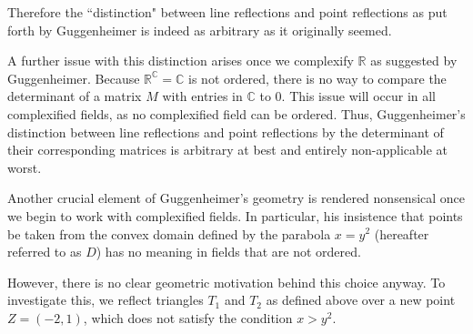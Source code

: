 \documentclass[12pt]{article}
\newcommand{\R}{\mathbb{R}}
\newcommand{\C}{\mathbb{C}}
\theoremstyle{plain}
\theoremstyle{definition}
\begin{document}
Therefore the ``distinction" between line reflections and point reflections as put forth by Guggenheimer is indeed as arbitrary as it originally seemed. 

A further issue with this distinction arises once we complexify $\R$ as suggested by Guggenheimer. Because $\R^{\C} = \C$ is not ordered, there is no way to compare the determinant of a matrix $M$ with entries in $\C$ to 0. This issue will occur in all complexified fields, as no complexified field can be ordered\cite{marsden_complex_book}. Thus, Guggenheimer's distinction between line reflections and point reflections by the determinant of their corresponding matrices is arbitrary at best and entirely non-applicable at worst.

Another crucial element of Guggenheimer's geometry is rendered nonsensical once we begin to work with complexified fields. In particular, his insistence that points be taken from the convex domain defined by the parabola $x = y^2$ (hereafter referred to as $D$) has no meaning in fields that are not ordered.

However, there is no clear geometric motivation behind this choice anyway. To investigate this, we reflect triangles $T_1$ and $T_2$ as defined above over a new point $Z = (-2, 1)$, which does not satisfy the condition $x > y^2$. 

\end{document}
